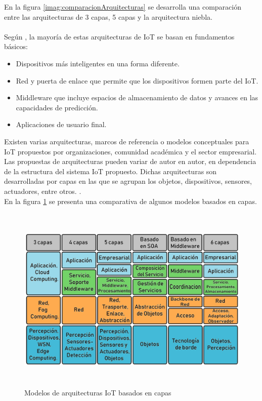     En la figura \ref{imag:comparacionArquitecturas} se desarrolla una comparación entre las arquitecturas de 3 capas, 5 capas y la arquitectura niebla.\\\\

    Según \cite{capasIoTciberseguridad}, la mayoría de estas arquitecturas de IoT se basan en fundamentos básicos:
    \begin{itemize}
        \item Dispositivos más inteligentes en una forma diferente.
        \item Red y puerta de enlace que permite que los dispositivos formen parte del IoT.
        \item Middleware que incluye espacios de almacenamiento de datos y avances en las capacidades de predicción.
        \item Aplicaciones de usuario final.
    \end{itemize}

    Existen varias arquitecturas, marcos de referencia o modelos conceptuales para IoT propuestos por organizaciones, comunidad académica y el sector empresarial. Las propuestas de arquitecturas pueden variar de autor en autor, en dependencia de la estructura del sistema IoT propuesto. Dichas arquitecturas son desarrolladas por capas en las que se agrupan los objetos, dispositivos, sensores, actuadores, entre otros. \cite{internetOfThingsStateOfTheArt} \cite{capasIoTciberseguridad}.\\

    En la figura \ref{imag:modelos_arquitecturas_iot} se presenta una comparativa de algunos modelos basados en capas.\\

    \vspace{5cm}

    \begin{figure}[h]
        \centering
        \includegraphics[width=15.6cm, height=9cm]{imagenes/capas.jpg}
        \caption{Modelos de arquitecturas IoT basados en capas}
        \label{imag:modelos_arquitecturas_iot}
    \end{figure}

